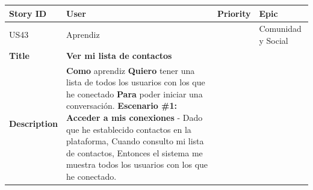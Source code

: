 {\def\LTcaptype{none} %
\begin{longtable}[]{@{}
  >{\raggedright\arraybackslash}p{}
  >{\raggedright\arraybackslash}p{}
  >{\raggedright\arraybackslash}p{}
  >{\raggedright\arraybackslash}p{}@{}}
\toprule\noalign{}
\begin{minipage}[b]{\linewidth}\raggedright
Story ID
\end{minipage} & \begin{minipage}[b]{\linewidth}\raggedright
User
\end{minipage} & \begin{minipage}[b]{\linewidth}\raggedright
Priority
\end{minipage} & \begin{minipage}[b]{\linewidth}\raggedright
Epic
\end{minipage} \\
\midrule\noalign{}
\endhead
\bottomrule\noalign{}
\endlastfoot
US43 & Aprendiz & 2 & Comunidad y Social \\
\textbf{Title} & \textbf{Ver mi lista de contactos} & & \\
\textbf{Description} & \textbf{Como} aprendiz \textbf{Quiero} tener una
lista de todos los usuarios con los que he conectado \textbf{Para} poder
iniciar una conversación. \textbf{Escenario \#1: Acceder a mis
conexiones} - Dado que he establecido contactos en la plataforma, Cuando
consulto mi lista de contactos, Entonces el sistema me muestra todos los
usuarios con los que he conectado. & & \\
\end{longtable}
}

